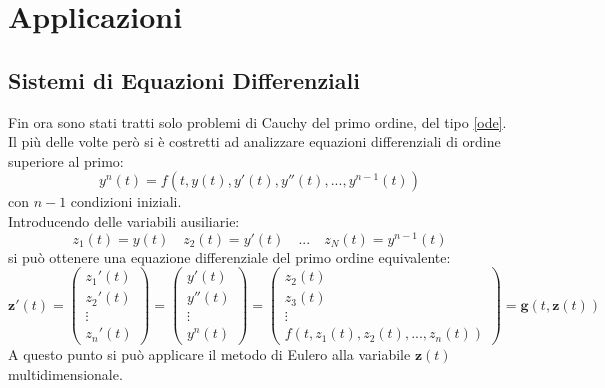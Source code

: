 \chapter{Applicazioni}
\section{Sistemi di Equazioni Differenziali}
Fin ora sono stati tratti solo problemi di Cauchy del primo ordine, del tipo \ref{ode}. Il più delle volte però si è costretti ad analizzare equazioni differenziali di ordine superiore al primo:
\begin{equation}
	y^n(t) = f(t, y(t), y'(t), y''(t),...,y^{n-1}(t))
\end{equation}
con $n-1$ condizioni iniziali.
\\Introducendo delle variabili ausiliarie:
\begin{equation*}
	z_1(t) = y(t) \quad z_2(t) = y'(t) \quad ... \quad z_N(t) = y^{n-1}(t)
\end{equation*}
si può ottenere una equazione differenziale del primo ordine equivalente:
\begin{equation*}
	\textbf{z}'(t) = \begin{pmatrix}
		z_1'(t) \\ z_2'(t) \\ \vdots \\ z_n'(t)
	\end{pmatrix}
 	= \begin{pmatrix}
 		y'(t) \\ y''(t) \\ \vdots \\ y^{n}(t)
 	\end{pmatrix}
 	= \begin{pmatrix}
 		z_2(t) \\ z_3(t) \\ \vdots \\ f(t, z_1(t), z_2(t), ..., z_n(t))
 	\end{pmatrix}
 	= \textbf{g}(t, \textbf{z}(t))
\end{equation*}
A questo punto si può applicare il metodo di Eulero alla variabile $\textbf{z}(t)$ multidimensionale.
